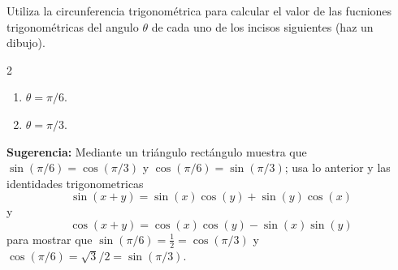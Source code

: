 \documentclass[12pt,a4paper]{article}
\begin{document}
    \begin{mdframed}[style=mdbluebox,frametitle={Ejercicio 2}]
        Utiliza la circunferencia trigonométrica para calcular el valor de las fucniones trigonométricas
        del angulo $\theta$ de cada uno de los incisos siguientes (haz un dibujo).
        \begin{multicols}{2}
            \begin{enumerate}
                \item[(a)]  $\theta=\pi/6.$
                \item[(b)]  $\theta=\pi/3.$
            \end{enumerate}
        \end{multicols}
        \textbf{Sugerencia:} Mediante un triángulo rectángulo muestra que $\sin(\pi/6)=\cos(\pi/3)$ y
        $\cos(\pi/6)=\sin(\pi/3)$; usa lo anterior y las identidades trigonometricas
        \begin{equation*}
            \sin(x+y)=\sin(x)\cos(y)+\sin(y)\cos(x)
        \end{equation*}
        y
        \begin{equation*}
            \cos(x+y)=\cos(x)\cos(y)-\sin(x)\sin(y)
        \end{equation*}
        para mostrar que $\sin(\pi/6)=\frac{1}{2}=\cos(\pi/3)$ y $\cos(\pi/6)=\sqrt{3}/2=\sin(\pi/3)$.
    \end{mdframed}
\end{document}
